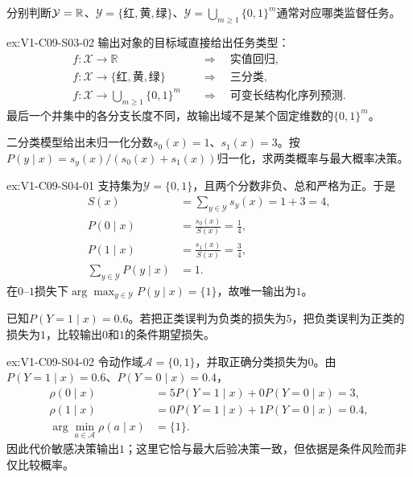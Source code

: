 \begin{SLChapterExercisePairSection}
\begin{exercise}[输出空间与任务]\label{ex:V1-C09-S03-02}
分别判断$\mathcal Y=\mathbb{R}$、$\mathcal Y=\{\text{红},\text{黄},\text{绿}\}$、$\mathcal Y=\bigcup_{m\ge1}\{0,1\}^m$通常对应哪类监督任务。
\end{exercise}
\label{sol:V1-C09-S03-02}
\begin{chapterexercisesolution}{ex:V1-C09-S03-02}
输出对象的目标域直接给出任务类型：
\[
\begin{aligned}
f:\mathcal X\to\mathbb R
  &\quad\Longrightarrow\quad \text{实值回归},\\
f:\mathcal X\to\{\text{红},\text{黄},\text{绿}\}
  &\quad\Longrightarrow\quad \text{三分类},\\
f:\mathcal X\to\bigcup_{m\ge1}\{0,1\}^{m}
  &\quad\Longrightarrow\quad \text{可变长结构化序列预测}.
\end{aligned}
\]
最后一个并集中的各分支长度不同，故输出域不是某个固定维数的$\{0,1\}^m$。
\end{chapterexercisesolution}

\begin{exercise}[概率模型归一化]\label{ex:V1-C09-S04-01}
二分类模型给出未归一化分数$s_0(x)=1$、$s_1(x)=3$。按$P(y\mid x)=s_y(x)/(s_0(x)+s_1(x))$归一化，求两类概率与最大概率决策。
\end{exercise}
\label{sol:V1-C09-S04-01}
\begin{chapterexercisesolution}{ex:V1-C09-S04-01}
支持集为$\mathcal Y=\{0,1\}$，且两个分数非负、总和严格为正。于是
\[
\begin{aligned}
S(x)&=\sum_{y\in\mathcal Y}s_y(x)=1+3=4,\\
P(0\mid x)&=\frac{s_0(x)}{S(x)}=\frac14,\\
P(1\mid x)&=\frac{s_1(x)}{S(x)}=\frac34,\\
\sum_{y\in\mathcal Y}P(y\mid x)&=1.
\end{aligned}
\]
在$0$--$1$损失下$\arg\max_{y\in\mathcal Y}P(y\mid x)=\{1\}$，故唯一输出为$1$。
\end{chapterexercisesolution}

\begin{exercise}[模型与决策]\label{ex:V1-C09-S04-02}
已知$P(Y=1\mid x)=0.6$。若把正类误判为负类的损失为$5$，把负类误判为正类的损失为$1$，比较输出$0$和$1$的条件期望损失。
\end{exercise}
\label{sol:V1-C09-S04-02}
\begin{chapterexercisesolution}{ex:V1-C09-S04-02}
令动作域$\mathcal A=\{0,1\}$，并取正确分类损失为$0$。由
$P(Y=1\mid x)=0.6$、$P(Y=0\mid x)=0.4$，
\[
\begin{aligned}
\rho(0\mid x)
  &=5P(Y=1\mid x)+0P(Y=0\mid x)=3,\\
\rho(1\mid x)
  &=0P(Y=1\mid x)+1P(Y=0\mid x)=0.4,\\
\arg\min_{a\in\mathcal A}\rho(a\mid x)&=\{1\}.
\end{aligned}
\]
因此代价敏感决策输出$1$；这里它恰与最大后验决策一致，但依据是条件风险而非仅比较概率。
\end{chapterexercisesolution}


\end{SLChapterExercisePairSection}

